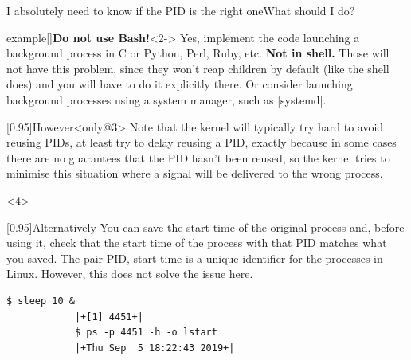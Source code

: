 \begin{frame}[fragile]{I absolutely need to know if the PID is the right one}{What should I do?}
    \vspace{-3mm}
    \large
    \begin{varblock}{example}[\textwidth]{\textbf{Do not use Bash!}}<2->
        Yes, implement the code launching a background process in C or Python, Perl, Ruby, etc.
        \textbf{Not in shell.}
        Those will not have this problem, since they won't reap children by default (like the shell does) and you will have to do it explicitly there.
        Or consider launching background processes using a system manager, such as \bash|systemd|.
    \end{varblock}
    \small
    \begin{varblock}{}[0.95\textwidth]{However}<only@3>
        Note that the kernel will typically try hard to avoid reusing PIDs, at least try to delay reusing a PID, exactly because in some cases there are no guarantees that the PID hasn't been reused, so the kernel tries to minimise this situation where a signal will be delivered to the wrong process.
    \end{varblock}
    \vspace{-2pt}
    \begin{onlyenv}<4>
        \begin{varblock}{}[0.95\textwidth]{Alternatively}
            You can save the start time of the original process and, before using it, check that the start time of the process with that PID matches what you saved.
            The pair PID, start-time is a unique identifier for the processes in Linux.
            However, this does not solve the issue here.
        \end{varblock}
        \begin{lstlisting}[style=MyBash, numbers=none]
            $ sleep 10 &
            |+[1] 4451+|
            $ ps -p 4451 -h -o lstart
            |+Thu Sep  5 18:22:43 2019+|
        \end{lstlisting}
    \end{onlyenv}
\end{frame}
